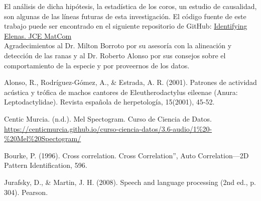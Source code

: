 \documentclass[a4paper,10pt,twocolumn]{article}
\begin{document}
El análisis de dicha hipótesis, la estadística de los coros,
un estudio de causalidad, son algunas de las líneas futuras de esta investigación. 
El código fuente de este trabajo puede ser encontrado en el siguiente repositorio de GitHub:
\href{https://github.com/DanielMPMatCom/Identifying-Elenas.-JCE-MatCom.git}{Identifying Elenas. JCE MatCom}\\


Agradecimientos al Dr. Milton Borroto por su asesoría con la alineación y detección de las ranas y al Dr. Roberto Alonso por sus consejos sobre el comportamiento de la especie y por proveernos de los datos.

\begin{thebibliography}{}
	
	 Alonso, R., Rodríguez-Gómez, A., \& Estrada, A. R. (2001). Patrones de actividad acústica y trófica de machos cantores de Eleutherodactylus eileenae (Anura: Leptodactylidae). Revista española de herpetología, 15(2001), 45-52.

	
	 Centic Murcia. (n.d.). Mel Spectogram. Curso de Ciencia de Datos. \href{https://centicmurcia.github.io/curso-ciencia-datos/3.6-audio/1\%20-\%20Mel\%20Spectogram/}{https://centicmurcia.github.io/curso-ciencia-datos/3.6-audio/1\%20-\%20Mel\%20Spectogram/}
	
	\sloppypar
	 Bourke, P. (1996). Cross correlation. Cross Correlation”, Auto Correlation—2D Pattern Identification, 596.
  
	 Jurafsky, D., \& Martin, J. H. (2008). Speech and language processing (2nd ed., p. 304). Pearson.

\end{thebibliography}
	  




\label{end}
\end{document}
